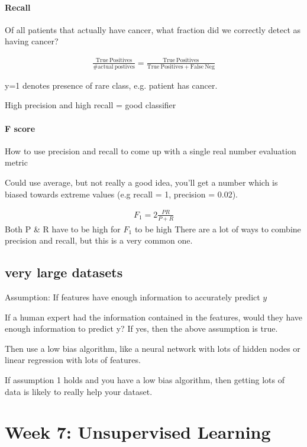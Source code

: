 \documentclass[fontsize=11]{article}
\begin{document}
\paragraph{Recall}
Of all patients that actually have cancer, what fraction did we correctly detect as having cancer?

\begin{align*}
\frac{\mathrm{True \ Positives}}{\# \mathrm{actual \ postives}} = \frac{\mathrm{True \ Positives}}{\mathrm{True \ Positives} + \mathrm{False \ Neg}}
\end{align*}

y=1 denotes presence of rare class, e.g. patient has cancer.

High precision and high recall = good classifier

\paragraph{F score }
How to use precision and recall to come up with a single real number evaluation metric

Could use average, but not really a good idea, you'll get a number which is biased towards extreme values (e.g recall = 1, precision = 0.02).

\begin{align*}
F_1 = 2 \frac{PR}{P+R}
\end{align*}
Both P \& R have to be high for $F_1$ to be high
There are a lot of ways to combine precision and recall, but this is a very common one.

\subsection{very large datasets}
Assumption: If features have enough information to accurately predict $y$

If a human expert had the information contained in the features, would they have enough information to predict y? If yes, then the above assumption is true. 

Then use a low bias algorithm, like a neural network with lots of hidden nodes or linear regression with lots of features. 

If assumption 1 holds and you have a low bias algorithm, then getting lots of data is likely to really help your dataset.

\section{Week 7: Unsupervised Learning }
\end{document}
